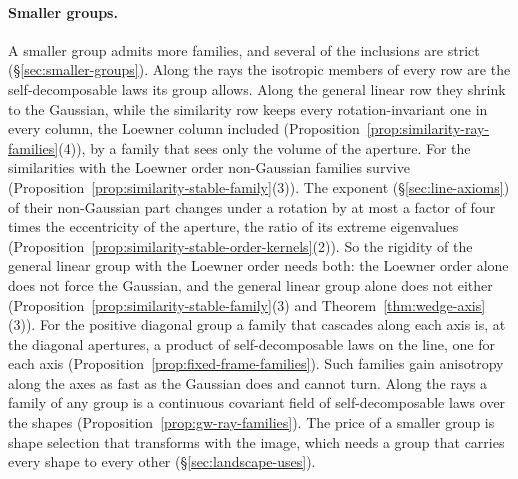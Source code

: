 \paragraph{Smaller groups.} A smaller group admits more families, and several of the inclusions are
strict (\S\ref{sec:smaller-groups}). Along the rays the isotropic members of every row are the
self-decomposable laws its group allows. Along the general linear row they shrink to the Gaussian,
while the similarity row keeps every rotation-invariant one in every column, the Loewner column included
(Proposition~\ref{prop:similarity-ray-families}(4)), by a family that sees only the volume of the
aperture. For the similarities with the Loewner order non-Gaussian families
survive (Proposition~\ref{prop:similarity-stable-family}(3)). The exponent (\S\ref{sec:line-axioms}) of their non-Gaussian part
changes under a rotation by at most a factor of four times the eccentricity of the aperture, the ratio
of its extreme eigenvalues (Proposition~\ref{prop:similarity-stable-order-kernels}(2)). So the rigidity of the general linear
group with the Loewner order needs both: the Loewner order alone does not force the Gaussian, and the
general linear group alone does not either (Proposition~\ref{prop:similarity-stable-family}(3) and
Theorem~\ref{thm:wedge-axis}(3)). For the positive diagonal group a family that cascades along each axis is, at the diagonal
apertures, a product of self-decomposable laws on the line, one for each axis
(Proposition~\ref{prop:fixed-frame-families}). Such families gain anisotropy along the axes as fast as the
Gaussian does and cannot turn. Along the rays a family of any group is a continuous covariant field of
self-decomposable laws over the shapes (Proposition~\ref{prop:gw-ray-families}). The price of a smaller
group is shape selection that transforms with the image, which needs a group that carries every shape
to every other (\S\ref{sec:landscape-uses}).

